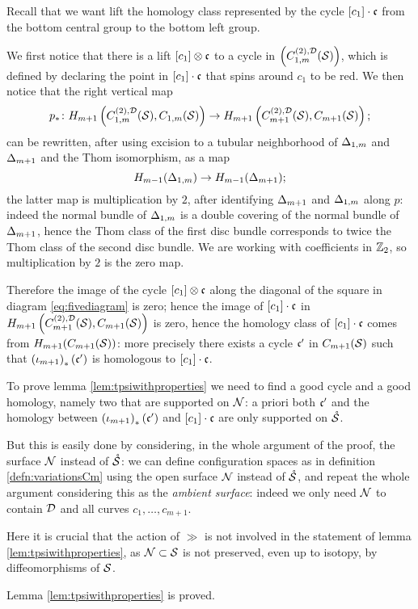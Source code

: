 Recall that we want lift the homology class represented by the cycle $[c_1]\cdot\fc$
from the bottom central group to the bottom left group.

We first notice that there is a lift $[c_1]\otimes\fc$ to a cycle in $\pa{\fmstwoD}$,
which is defined by declaring the point in $[c_1]\cdot\fc$ that spins around $c_1$
to be red. We then notice that the right vertical map
\[
\p_*\colon H_{m+1}\pa{\fmstwoD, C_{1,m}(\S)} \to H_{m+1}\pa{\cmstwoD,C_{m+1}(\S)};
\]
can be rewritten, after using excision to a tubular neighborhood of $\Donem$ and $\Dmone$ and
the Thom isomorphism, as a map
\[
 H_{m-1}(\Donem)\to H_{m-1}(\Dmone);
\]
the latter map is multiplication by $2$, after identifying $\Dmone$ and $\Donem$ along $p$:
indeed the normal bundle of $\Donem$ is a
double covering of the normal bundle of $\Dmone$, hence the Thom class of the first disc
bundle corresponds to twice the Thom class of the second disc bundle. We are working
with coefficients in $\Z_2$, so multiplication by $2$ is the zero map.

Therefore the image of the cycle $[c_1]\otimes \fc$ along the diagonal of the square
in diagram \ref{eq:fivediagram} is zero; hence the image of $[c_1]\cdot\fc$ in $H_{m+1}\pa{\cmstwoD,C_{m+1}(\S)}$
is zero, hence the homology class of $[c_1]\cdot\fc$ comes from $H_{m+1}(C_{m+1}(\S))$: more
precisely there exists a cycle $\fc'$ in $C_{m+1}(\S)$ such that $\pa{\iota_{m+1}}_*(\fc')$ is homologous
to $[c_1]\cdot\fc$.

To prove lemma \ref{lem:tpsiwithproperties} we need to find a good cycle and
a good homology, namely two that are supported on $\N$: a priori both $\fc'$ and the homology
between $\pa{\iota_{m+1}}_*(\fc')$ and $[c_1]\cdot\fc$ are only supported on $\mrS$.

But this is easily done by considering, in the whole argument of the proof, the surface $\N$ instead of $\mrS$:
we can define configuration spaces as in definition \ref{defn:variationsCm} using the open surface
$\N$ instead of $\mrS$, and repeat the whole argument considering this as the \emph{ambient surface}:
indeed we only need $\N$ to contain $\D$ and all curves $c_1,\dots,c_{m+1}$.

Here it is crucial that the action of $\gg$ is not involved in the statement of lemma
\ref{lem:tpsiwithproperties}, as $\N\subset\S$ is not preserved, even up to isotopy,
by diffeomorphisms of $\S$.

Lemma \ref{lem:tpsiwithproperties} is proved.

